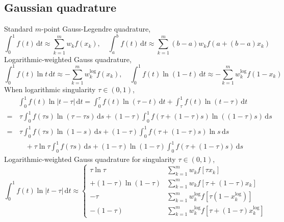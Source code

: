 \documentclass{jfm}
\begin{document}
\subsection{Gaussian  quadrature}
Standard $m$-point Gauss-Legendre quadrature,
\begin{equation}
\int_0^1 f(t)\,\mathrm{d}t\approx \sum_{k=1}^{m}w_k f(x_k),\quad
\int_a^b f(t)\,\mathrm{d}t\approx \sum_{k=1}^{m}(b-a)w_k f( a+(b-a)x_k)
\end{equation}
Logarithmic-weighted Gauss quadrature,
\begin{equation}
\int_0^1 f(t) \ln t \,\mathrm{d}t\approx -\sum_{k=1}^{m}w_k^\mathrm{log} f(x_k),\quad
\int_0^1 f(t) \ln (1-t) \,\mathrm{d}t\approx -\sum_{k=1}^{m}w_k^\mathrm{log} f(1-x_k)
\end{equation}
When logarithmic singularity $\tau\in (0,1)$,
\begin{align*}
&\int_0^1 f(t) \ln |t-\tau|\,\mathrm{d}t 
=\int_0^\tau f(t) \ln (\tau - t)\,\mathrm{d}t+\int_\tau^1 f(t) \ln (t-\tau)\,\mathrm{d}t\\
=&\,\tau\int_0^1 f(\tau s) \ln (\tau - \tau s)\,\mathrm{d}s
+(1-\tau) \int_0^1 f(\tau + (1-\tau) s) \ln ( (1-\tau) s)\,\mathrm{d}s\\
=&\,\tau\int_0^1 f(\tau s) \ln (1 - s)\,\mathrm{d} s
+(1-\tau) \int_0^1 f(\tau + (1-\tau) s) \ln s\,\mathrm{d}s\\
&\quad+\tau\ln\tau\int_0^1 f(\tau s) \,\mathrm{d} s
+(1-\tau)\ln (1-\tau) \int_0^1 f(\tau + (1-\tau) s) \,\mathrm{d}s
\end{align*}
Logarithmic-weighted Gauss quadrature for singularity $\tau\in (0,1)$,
\begin{equation}\int_0^1 f(t) \ln |t-\tau|\,\mathrm{d}t 
\approx\left\{ 
\begin{aligned}
\tau\ln\tau &\sum_{k=1}^m w_k f\left[\tau x_k\right] \\
+ (1- \tau)\ln(1-\tau) &\sum_{k=1}^m w_k f\left[\tau + (1-\tau)x_k\right]\\
- \tau &\sum_{k=1}^m w_k^\mathrm{log} f\left[\tau(1 -x_k^\mathrm{log})\right]\\
- (1- \tau) &\sum_{k=1}^m w_k^\mathrm{log} f\left[\tau + (1-\tau)x_k^\mathrm{log}\right]
\end{aligned}\right.
\end{equation}
\end{document}

